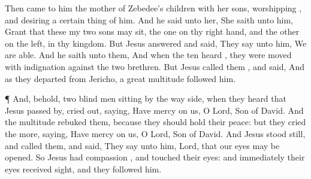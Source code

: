 {Then
came to
him the
mother
of
Zebedee’s
children
with
her
sons,
worshipping
{},
and
desiring a certain
thing
of
him.
And he
said unto
her,
{} She
saith unto
him,
Grant
that
these
my
two
sons may
sit, the
one
on
thy right
hand,
and the
other
on the
left,
in
thy
kingdom.
But
Jesus
answered and
said,
{} They
say unto
him, We are
able.
And he
saith unto
them,
{}
And
when the
ten
heard
{}, they were moved with
indignation
against the
two
brethren.
But
Jesus
called
them
{}, and
said,
{}
And
as
they
departed
from
Jericho,
a
great
multitude
followed
him.
\par }{\PP {}¶
And,
behold,
two blind
men
sitting
by the way
side, when they
heard
that
Jesus passed
by, cried
out,
saying, Have mercy
on
us, O
Lord,
{}
Son of
David.
And the
multitude
rebuked
them,
because they should hold their
peace:
but they
cried the
more,
saying, Have mercy
on
us, O
Lord,
{}
Son of
David.
And
Jesus stood
still, and
called
them,
and
said,
{}
They
say unto
him,
Lord,
that
our
eyes may be
opened.
So
Jesus had
compassion
{}, and
touched
their
eyes:
and
immediately
their
eyes received
sight,
and they
followed
him.

}
